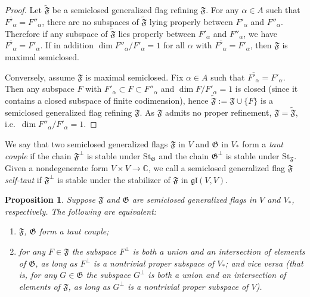 \documentclass{article}
\newcommand {\C} {\mathbb{C}}
\newcommand {\St} {\mathrm{St}}
\def\gl{\mathfrak {gl}}
\def\F{\mathfrak{F}}
\def\G{\mathfrak{G}}
\newtheorem{prop}[thm]{Proposition}
\begin{document}
\begin{proof}
Let $\tilde{\F}$ be a semiclosed generalized flag refining $\F$.  For any $\alpha \in A$ such that $\overline{F'_\alpha} = F''_\alpha$, there are no subspaces of $\tilde{\F}$ lying properly between $F'_\alpha$ and $F''_\alpha$.  Therefore if any subspace of $\tilde{\F}$ lies properly between $F'_\alpha$ and $F''_\alpha$, we have $\overline{F'_\alpha} = F'_\alpha$.  If in addition $\dim F''_\alpha / F'_\alpha = 1$ for all $\alpha$ with $\overline{F'_\alpha} = F'_\alpha$, then $\F$ is maximal semiclosed.

Conversely, assume $\F$ is maximal semiclosed.  Fix $\alpha \in A$ such that $\overline{F'_\alpha} = F'_\alpha$.  Then any subspace $F$ with $F'_\alpha \subset F \subset F''_\alpha$ and $\dim F / F'_\alpha = 1$ is closed (since it contains a closed subspace of finite codimension), hence $\tilde{\F} := \F \cup \{F\}$ is a semiclosed generalized flag refining $\F$.  As $\F$ admits no proper refinement, $\F = \tilde{\F}$, i.e.\ $\dim F''_\alpha / F'_\alpha = 1$.
\end{proof}

We say that two semiclosed generalized flags $\F$ in $V$ and $\G$ in $V_*$ form a \emph{taut couple} if the chain $\F^\perp$ is stable under $\St_\G$ and the chain $\G^\perp$ is stable under $\St_\F$.  Given a nondegenerate form $V \times V \rightarrow \C$, we call a semiclosed generalized flag $\F$ \emph{self-taut} if $\F^\perp$ is stable under the stabilizer of $\F$ in $\gl(V,V)$.


\begin{prop} \label{tautchar}
Suppose $\F$ and $\G$ are semiclosed generalized flags in $V$ and $V_*$, respectively.  The following are equivalent:
\begin{enumerate}
\item \label{tautcondition} $\F$, $\G$ form a taut couple;
\item \label{intersectioncondition} for any $F \in \F$ the subspace $F^\perp$ is both a union and an intersection of elements of $\G$, as long as $F^\perp$ is a nontrivial proper subspace of $V_*$; and vice versa (that is, for any $G \in \G$ the subspace $G^\perp$ is both a union and an intersection of elements of $\F$, as long as $G^\perp$ is a nontrivial proper subspace of $V$).
\end{enumerate}
\end{prop}
\end{document}
